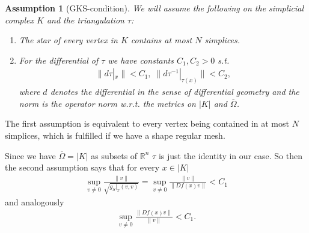 \documentclass[12pt,a4paper]{article}
\newtheorem{assumption}{Assumption}
\newcommand{\omegabar}{\overline{\Omega}}
\newcommand{\real}{\mathbb{R}}
\begin{document}
\begin{assumption}[GKS-condition]
    We will assume the following on the simplicial complex $K$ 
    and the triangulation $\tau$:
    \begin{enumerate}
    \item The star of every vertex in $K$ contains at most $N$ simplices.
    \item For the differential of $\tau$ we have constants 
        $C_1, C_2 > 0$ s.t.
        \begin{align*}
        \lVert d\tau|_x \rVert < C_1, \; 
        \lVert d\tau^{-1}|_{\tau(x)} \rVert < C_2,
        \end{align*}
        where $d$ denotes the differential in the sense of differential 
        geometry and the norm is the operator norm w.r.t. the metrics on $|K|$ 
        and $\omegabar$.
    \end{enumerate}
\end{assumption}
The first assumption is equivalent to every vertex being contained in
at most $N$ simplices, which is fulfilled if we have a shape regular mesh.\par

Since we have $\omegabar = |K|$ as subsets of $\real^n$ $\tau$ is just the 
identity in our case. So then the second assumption says that for every 
$x \in |K|$
\begin{align*}
\sup\limits_{v \neq 0} \frac{\lVert v \rVert}{\sqrt{g_S|_x(v,v)}} =
\sup\limits_{v \neq 0} \frac{\lVert v \rVert}{\lVert Df(x)v\rVert} < C_1
\end{align*}
and analogously
\begin{align*}
    \sup\limits_{v \neq 0} \frac{\lVert Df(x)v\rVert}{\lVert v \rVert} < C_1.
\end{align*}

\end{document}
